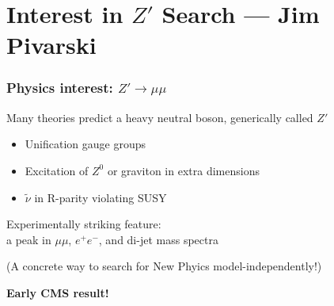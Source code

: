 \documentclass[compress]{beamer}
\begin{document}
\section*{Interest in $Z'$ Search --- Jim Pivarski}

\begin{frame}
\frametitle{Physics interest: $Z'\to\mu\mu$}

Many theories predict a heavy neutral boson, generically called $Z'$

\begin{itemize}
  \item Unification gauge groups
  \item Excitation of $Z^0$ or graviton in extra dimensions
  \item $\tilde{\nu}$ in R-parity violating SUSY
\end{itemize}

\vfill Experimentally striking feature: \\
\hspace{1.5 cm} a peak in $\mu\mu$, $e^+e^-$, and di-jet mass spectra

\vfill (A concrete way to search for New Phyics model-independently!)

\vfill \bf Early CMS result!
\end{frame}
\end{document}
